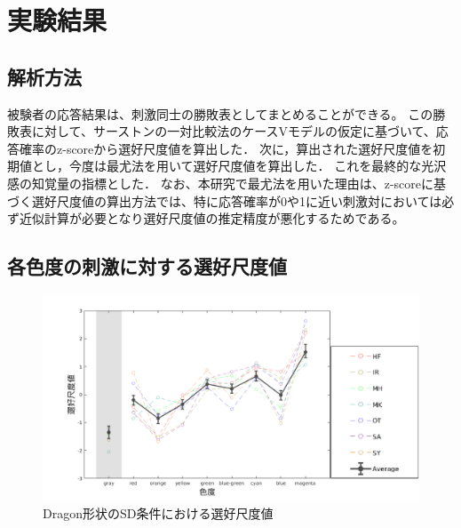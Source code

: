     \section{実験結果}
        \subsection{解析方法}
            被験者の応答結果は、刺激同士の勝敗表としてまとめることができる。
            この勝敗表に対して、サーストンの一対比較法のケースVモデルの仮定に基づいて、応答確率のz-scoreから選好尺度値を算出した．
            次に，算出された選好尺度値を初期値とし，今度は最尤法を用いて選好尺度値を算出した．
            これを最終的な光沢感の知覚量の指標とした．
            なお、本研究で最尤法を用いた理由は、z-scoreに基づく選好尺度値の算出方法では、特に応答確率が0や1に近い刺激対においては必ず近似計算が必要となり選好尺度値の推定精度が悪化するためである。
            
        \newpage
        \subsection{各色度の刺激に対する選好尺度値}
            
            \begin{figure}[h]
                \centering
                \includegraphics[width=15.0cm]{./img/ex1_res_DSD_p.png}
                \caption{Dragon形状のSD条件における選好尺度値}
                \label{ex1_DSD}
            \end{figure}


